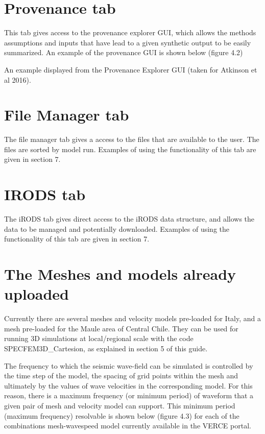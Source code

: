 \documentclass[english]{book}
\begin{document}
\section{Provenance tab}
\label{\detokenize{Section4:provenance-tab}}

This tab gives access to the provenance explorer GUI, which allows the
methods assumptions and inputs that have lead to a given synthetic
output to be easily summarized. An example of the provenance GUI is
shown below (figure 4.2)


 An example displayed from the Provenance Explorer GUI
(taken for Atkinson et al 2016).


\section{File Manager tab}
\label{\detokenize{Section4:file-manager-tab}}

The file manager tab gives a access to the files that are available to
the user. The files are sorted by model run. Examples of using the
functionality of this tab are given in section 7.


\section{IRODS tab}
\label{\detokenize{Section4:irods-tab}}

The iRODS tab gives direct access to the iRODS data structure, and
allows the data to be managed and potentially downloaded. Examples of
using the functionality of this tab are given in section 7.


\section{The Meshes and models already uploaded}
\label{\detokenize{Section4:the-meshes-and-models-already-uploaded}}
Currently there are several meshes and velocity models pre-loaded for
Italy, and a mesh pre-loaded for the Maule area of Central Chile. They
can be used for running 3D simulations at local/regional scale with the
code SPECFEM3D\_Cartesion, as explained in section 5 of this guide.

The frequency to which the seismic wave-field can be simulated is
controlled by the time step of the model, the spacing of grid points
within the mesh and ultimately by the values of wave velocities in the
corresponding model. For this reason, there is a maximum frequency (or
minimum period) of waveform that a given pair of mesh and velocity model
can support. This minimum period (maximum frequency) resolvable is shown
below (figure 4.3) for each of the combinations mesh-wavespeed model
currently available in the VERCE portal.
\end{document}

